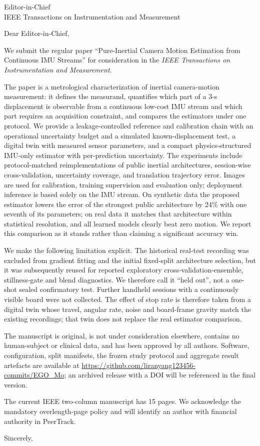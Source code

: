 ﻿\documentclass[11pt]{letter}
\begin{document}
\begin{letter}{Editor-in-Chief\\
IEEE Transactions on Instrumentation and Measurement}
\opening{Dear Editor-in-Chief,}

We submit the regular paper ``Pure-Inertial Camera Motion Estimation from
Continuous IMU Streams'' for consideration in the \emph{IEEE Transactions on
Instrumentation and Measurement}.

The paper is a metrological characterization of inertial camera-motion
measurement: it defines the measurand, quantifies which part of a 3-s
displacement is observable from a continuous low-cost IMU stream and which
part requires an acquisition constraint, and compares the estimators under
one protocol. We provide a leakage-controlled reference and calibration chain
with an operational uncertainty budget and a simulated known-displacement
test, a digital twin with measured sensor parameters, and a compact
physics-structured IMU-only estimator with per-prediction uncertainty. The
experiments include protocol-matched reimplementations of public inertial
architectures, session-wise cross-validation, uncertainty coverage, and
translation trajectory error. Images are used for calibration, training
supervision and evaluation only; deployment inference is based solely on the
IMU stream. On synthetic data the proposed estimator lowers the error of the
strongest public architecture by 24\% with one seventh of its parameters; on
real data it matches that architecture within statistical resolution, and all
learned models clearly beat zero motion. We report this comparison as it
stands rather than claiming a significant accuracy win.

We make the following limitation explicit. The historical real-test recording
was excluded from gradient fitting and the initial fixed-split architecture
selection, but it was subsequently reused for reported exploratory
cross-validation-ensemble, stillness-gate and blend diagnostics. We therefore
call it ``held out'', not a one-shot sealed confirmatory test. Further
handheld sessions with a continuously visible board were not collected.
The effect of stop rate is therefore taken from a digital twin whose travel,
angular rate, noise and board-frame gravity match the existing recordings;
that twin does not replace the real estimator comparison.

The manuscript is original, is not under consideration elsewhere, contains no
human-subject or clinical data, and has been approved by all authors. Software,
configuration, split manifests, the frozen study protocol and aggregate result
artefacts are available at
\url{https://github.com/liranyang123456-commits/EGO_Mo}; an archived release
with a DOI will be referenced in the final version.

The current IEEE two-column manuscript has 15 pages. We acknowledge the
mandatory overlength-page policy and will identify an author with financial
authority in PeerTrack.

\closing{Sincerely,}
\end{letter}
\end{document}
